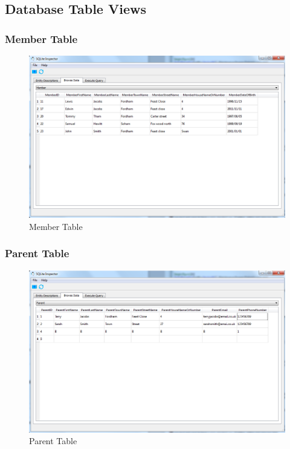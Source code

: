 \subsection{Database Table Views}

\subsubsection{Member Table}
\begin{figure}[H]
\includegraphics[width=\textwidth]{./Maintenance/Images/DatabaseMember.png}
    \caption{Member Table} \label{fig:member_table}
\end{figure}

\subsubsection{Parent Table}
\begin{figure}[H]
\includegraphics[width=\textwidth]{./Maintenance/Images/DatabaseParent.png}
    \caption{Parent Table} \label{fig:parent_table}
\end{figure}

